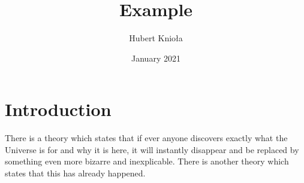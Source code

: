 \documentclass{article}
\title{Example}
\author{Hubert Knioła }
\date{January 2021}
\begin{document}
\maketitle

\section{Introduction}
There is a theory which states that if ever anyone discovers exactly what the Universe is for and why it is here, it will instantly disappear and be replaced by something even more bizarre and inexplicable.
There is another theory which states that this has already happened.



\end{document}
